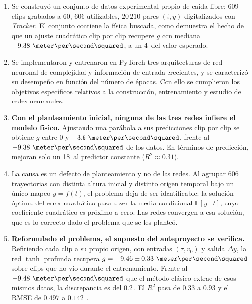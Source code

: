 \documentclass[titlepage,11pt]{article}
\providecommand{\num}[1]{\ensuremath{#1}}
\providecommand{\SI}[2]{#1\,#2}
\providecommand{\percent}{\char37\relax}
\begin{document}
\begin{enumerate}
\item Se construyó un conjunto de datos experimental propio de caída libre: 609
  clips grabados a \unit{60}{\hertz}, 606 utilizables, \num{20\,210} pares
  $(t,y)$ digitalizados con \emph{Tracker}. El conjunto contiene la física
  buscada, como demuestra el hecho de que un ajuste cuadrático clip por clip
  recupere $g$ con mediana $\num{-9.38}~\meter\per\second\squared$, a un
  \SI{4}{\percent} del valor esperado.

\item Se implementaron y entrenaron en PyTorch tres arquitecturas de red
  neuronal de complejidad y información de entrada crecientes, y se
  caracterizó su desempeño en función del número de épocas. Con ello se
  cumplieron los objetivos específicos relativos a la construcción,
  entrenamiento y estudio de redes neuronales.

\item \textbf{Con el planteamiento inicial, ninguna de las tres redes infiere el
  modelo físico.} Ajustando una parábola a sus predicciones clip por clip se
  obtiene $g$ entre $\num{0}$ y $\num{-3.6}~\meter\per\second\squared$, frente
  al $\num{-9.38}~\meter\per\second\squared$ de los datos. En términos de
  predicción, mejoran solo un \SI{18}{\percent} al predictor constante
  ($R^2\approx\num{0.31}$).

\item La causa es un defecto de planteamiento y no de las redes. Al agrupar 606
  trayectorias con distinta altura inicial y distinto origen temporal bajo un
  único mapeo $y=f(t)$, el problema deja de ser identificable: la solución
  óptima del error cuadrático pasa a ser la media condicional
  $\mathbb{E}[y\mid t]$, cuyo coeficiente cuadrático es próximo a cero. Las
  redes convergen a esa solución, que es lo correcto dado el problema que se
  les planteó.

\item \textbf{Reformulado el problema, el supuesto del anteproyecto se
  verifica.} Refiriendo cada clip a su propio origen, con entradas $(\tau,v_0)$
  y salida $\Delta y$, la red $\tanh$ profunda recupera
  $g=\num{-9.46}\pm\num{0.33}~\meter\per\second\squared$ sobre clips que no vio
  durante el entrenamiento. Frente al $\num{-9.48}~\meter\per\second\squared$
  que el método clásico extrae de esos mismos datos, la discrepancia es del
  \SI{0.2}{\percent}. El $R^2$ pasa de \num{0.33} a \num{0.93} y el RMSE de
  \num{0.497} a \num{0.142}~\meter.


\end{enumerate}
\end{document}
